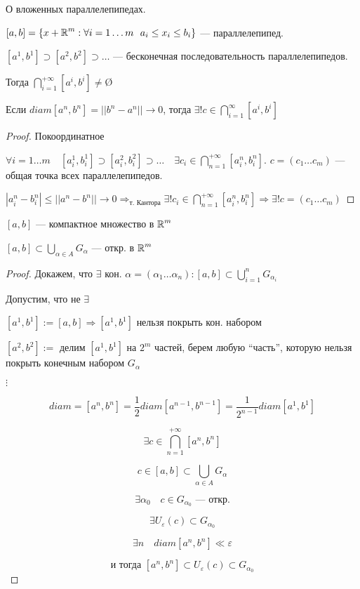 \begin{lemma}
    О вложенных параллелепипедах.

    $[a, b] = \{x+\R^m: \forall i=1\ldots m \ \ a_i\leq x_i\leq b_i\}$ --- параллелепипед.

    $[a^1, b^1]\supset[a^2, b^2]\supset\ldots$ --- бесконечная последовательность параллелепипедов.

    Тогда $\bigcap\limits_{i=1}^{+\infty}[a^i, b^i]\not=$\O

    Если $diam[a^n, b^n]=||b^n-a^n||\to 0$, тогда $\exists! c\in\bigcap\limits_{i=1}^\infty[a^i, b^i]$
\end{lemma}
\begin{proof}
    Покоординатное

    $\forall i=1\ldots m \quad [a^1_i, b^1_i]\supset[a^2_i, b^2_i]\supset\ldots \quad \exists c_i\in \bigcap\limits_{n=1}^{+\infty}[a_i^n, b_i^n]$. $c=(c_1\ldots c_m)$ --- общая точка всех параллелепипедов.

    $|a_i^n-b_i^n|\leq ||a^n-b^n||\to 0 \Rightarrow_{\text{т. Кантора}}\exists! c_i\in\bigcap\limits_{n=1}^{+\infty}[a_i^n, b_i^n] \Rightarrow \exists! c=(c_1\ldots c_m)$
\end{proof}
\begin{lemma}
    $[a,b]$ --- компактное множество в $\operatorname*{\mathbb{R}}^m$

    $[a, b]\subset\bigcup\limits_{\alpha\in A} G_\alpha$ --- откр. в $\operatorname*{\mathbb{R}}^m$
\end{lemma}

\begin{proof}
    Докажем, что $\exists$ кон. $\alpha=(\alpha_1\ldots\alpha_n): [a,b]\subset \bigcup\limits_{i=1}^n G_{\alpha_i}$

    Допустим, что не $\exists$

    $[a^1, b^1]:=[a,b] \Rightarrow [a^1, b^1]$ нельзя покрыть кон. набором

    $[a^2, b^2]:=$ делим $[a^1, b^1]$ на $2^m$ частей, берем любую ``часть'', которую нельзя покрыть конечным набором $G_\alpha$

    $\vdots$

    $$diam=[a^n, b^n]=\frac{1}{2}diam[a^{n-1}, b^{n-1}]=\frac{1}{2^{n-1}}diam[a^1,b^1]$$

    $$\exists c\in \bigcap\limits_{n=1}^{+\infty}[a^n, b^n]$$

    $$c\in [a, b] \subset \bigcup\limits_{\alpha\in A} G_\alpha$$

    $$\exists \alpha_0 \quad c\in G_{\alpha_0} \text{ --- откр.}$$
    
    $$\exists U_\varepsilon(c)\subset G_{\alpha_0}$$

    $$\exists n \quad diam[a^n, b^n] \ll \varepsilon$$

    $$\text{и тогда } [a^n, b^n]\subset U_\varepsilon(c)\subset G_{\alpha_0}$$
    
\end{proof}

